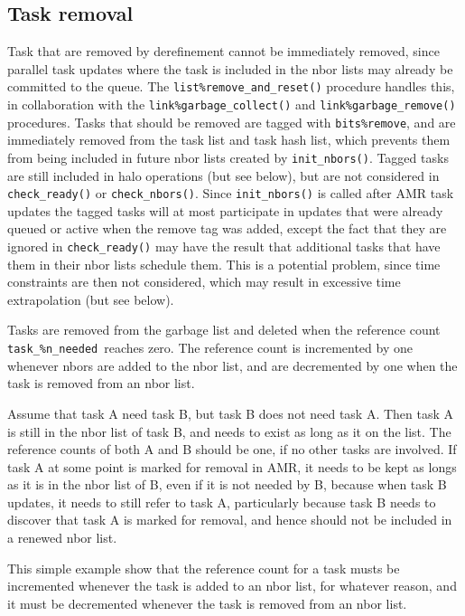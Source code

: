 \documentclass[paper=a4,fontsize=11pt]{scrartcl}
\numberwithin{equation}{section}		%
\numberwithin{figure}{section}			%
\numberwithin{table}{section}				%
\newcommand{\codecolor}{\color{Blue}}
\newcommand{\Code}[1]{{\codecolor\texttt{#1}}}
\def\checkready{\Code{check\_ready()}}
\def\checknbors{\Code{check\_nbors()}}
\def\initnbors{\Code{init\_nbors()}}
\begin{document}
\subsection{Task removal}
Task that are removed by derefinement cannot be immediately removed, since parallel task updates where the task is included in the nbor lists may already be committed to the queue.  The \verb|list%remove_and_reset()| procedure handles this, in collaboration with the \verb|link%garbage_collect()| and \verb|link%garbage_remove()| procedures.  Tasks that should be removed are tagged with \verb|bits%remove|, and are immediately removed from the task list and task hash list, which prevents them from being included in future nbor lists created by \initnbors{}.  Tagged tasks are still included in halo operations (but see below), but are not considered in \checkready{} or \checknbors.  Since \initnbors{} is called after AMR task updates the tagged tasks will at most participate in updates that were already queued or active when the remove tag was added, except the fact that they are ignored in \checkready{} may have the result that additional tasks that have them in their nbor lists schedule them.  This is a potential problem, since time constraints are then not considered, which may result in excessive time extrapolation (but see below).

\def\nneeded{\Code{task\_\%n\_needed}}
\def\needsme{\Code{nbor\_t\%needs\_me}}
Tasks are removed from the garbage list and deleted when the reference count \nneeded\ reaches zero.  The reference count is incremented by one whenever nbors are added to the nbor list, and are decremented by one when the task is removed from an nbor list.

Assume that task A need task B, but task B does not need task A.  Then task A is still in the nbor list of task B, and needs to exist as long as it on the list.  The reference counts of both A and B should be one, if no other tasks are involved.  If task A at some point is marked for removal in AMR, it needs to be kept as longs as it is in the nbor list of B, even if it is not needed by B, because when task B updates, it needs to still refer to task A, particularly because task B needs to discover that task A is marked for removal, and hence should not be included in a renewed nbor list.

This simple example show that the reference count for a task musts be incremented whenever the task is added to an nbor list, for whatever reason, and it must be decremented whenever the task is removed from an nbor list.
\end{document}
